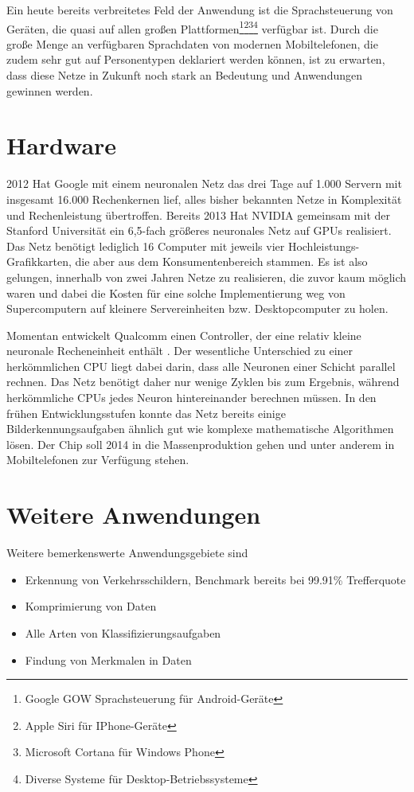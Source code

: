 Ein heute bereits verbreitetes Feld der Anwendung ist die Sprachsteuerung von Geräten, die quasi auf allen großen Plattformen\footnote{Google GOW Sprachsteuerung für Android-Geräte}\footnote{Apple Siri für IPhone-Geräte}\footnote{Microsoft Cortana für Windows Phone}\footnote{Diverse Systeme für Desktop-Betriebssysteme} verfügbar ist. Durch die große Menge an verfügbaren Sprachdaten von modernen Mobiltelefonen, die zudem sehr gut auf Personentypen deklariert werden können, ist zu erwarten, dass diese Netze in Zukunft noch stark an Bedeutung und Anwendungen gewinnen werden.

\section{Hardware}

2012 Hat Google mit einem neuronalen Netz das drei Tage auf 1.000 Servern mit insgesamt 16.000 Rechenkernen lief, alles bisher bekannten Netze in Komplexität und Rechenleistung übertroffen. Bereits 2013 Hat NVIDIA gemeinsam mit der Stanford Universität \citep{nvidia} ein 6,5-fach größeres neuronales Netz auf GPUs realisiert. Das Netz benötigt lediglich 16 Computer mit jeweils vier Hochleistungs-Grafikkarten, die aber aus dem Konsumentenbereich stammen. Es ist also gelungen, innerhalb von zwei Jahren Netze zu realisieren, die zuvor kaum möglich waren und dabei die Kosten für eine solche Implementierung weg von Supercomputern auf kleinere Servereinheiten bzw. Desktopcomputer zu holen.

Momentan entwickelt Qualcomm einen Controller, der eine relativ kleine neuronale Recheneinheit enthält \citep{Qualcomm}. Der wesentliche Unterschied zu einer herkömmlichen CPU liegt dabei darin, dass alle Neuronen einer Schicht parallel rechnen. Das Netz benötigt daher nur wenige Zyklen bis zum Ergebnis, während herkömmliche CPUs jedes Neuron hintereinander berechnen müssen. In den frühen Entwicklungsstufen konnte das Netz bereits einige Bilderkennungsaufgaben ähnlich gut wie komplexe mathematische Algorithmen lösen. Der Chip soll 2014 in die Massenproduktion gehen und unter anderem in Mobiltelefonen zur Verfügung stehen.

\section{Weitere Anwendungen}

Weitere bemerkenswerte Anwendungsgebiete sind

\begin{itemize}
\item Erkennung von Verkehrsschildern, Benchmark bereits bei 99.91\% Trefferquote \citep{trafficsign}
\item Komprimierung von Daten \citep{compression}
\item Alle Arten von Klassifizierungsaufgaben \citep{ClassificationMedicine} \citep{ClassificationWithNeuralNetworks}
\item Findung von Merkmalen in Daten \citep{FeatureDetection}
\end{itemize}

